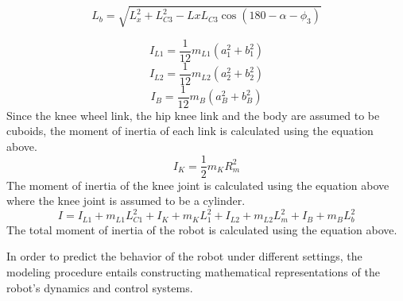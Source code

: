 
	\begin{equation}
		L_b = \sqrt{L_{x}^2 + L_{C3}^2 - Lx L_{C3} \cos(180 - \alpha - \phi_3 )}
	\end{equation}

	\begin{equation}
		I_{L1} = \frac{1}{12} m_{L1} (a_1^2 + b_1^2)
	\end{equation}
	\begin{equation}
		I_{L2} = \frac{1}{12} m_{L2} (a_2^2 + b_2^2)
	\end{equation}
	\begin{equation}
		I_B = \frac{1}{12} m_B (a_B^2 + b_B^2)
	\end{equation}
Since the knee wheel link, the hip knee link and the body are assumed to be cuboids, the moment of inertia of each link is calculated using the equation above.
	\begin{equation}
		I_K = \frac{1}{2} m_K R_m^2
	\end{equation}
	The moment of inertia of the knee joint is calculated using the equation above where the knee joint is assumed to be a cylinder.
	\begin{equation}
		I = I_{L1} + m_{L1} L_{C1}^2 + I_K + m_K L_1^2 + I_{L2} + m_{L2} L_m^2 + I_B + m_B L_b^2
	\end{equation}
	The total moment of inertia of the robot is calculated using the equation above.


	In order to predict the behavior of the robot under different settings, the modeling procedure entails constructing mathematical representations of the robot's dynamics and control systems.







	\newpage
